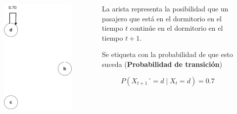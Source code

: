 \documentclass[11pt]{beamer}
\begin{document}
\begin{frame}
	\begin{columns}
		\begin{column}{0.5\textwidth}
			\vspace{-0.8cm}
			\begin{figure}
				\includegraphics[scale=0.5]{images/markov_uno.pdf}
			\end{figure}
		\end{column}
		\begin{column}{0.5\textwidth}
			La arista representa la posibilidad que un pasajero que está en el dormitorio en el tiempo $t$ continúe en el dormitorio en el tiempo $t+1$.
			
			\vspace{0.5cm}
			Se etiqueta con la probabilidad de que esto suceda (\textbf{Probabilidad de transición}) 
			
			\[P(X_{t+1}´ = d \mid X_t = d)=0.7\]

		\end{column}

	\end{columns}
	
\end{frame}
\end{document}
